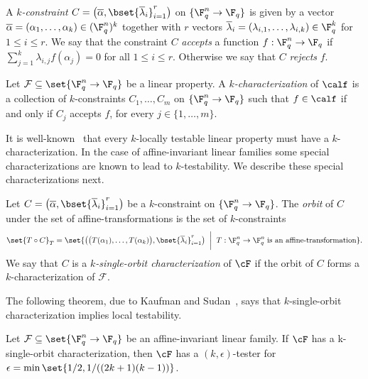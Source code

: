 \begin{definition}
A \emph{$k$-constraint} $C=\bigl(\overline \alpha, \bset{\overline \lambda_i}_{i=1}^{r}\bigr)$
on $\{\F_{q}^n \to \F_q\}$ is
given by a vector $\overline \alpha = (\alpha_1,\ldots,\alpha_k) \in (\F_{q}^n)^k$
together with $r$ vectors
 $\overline \lambda_i = (\lambda_{i,1}, \ldots, \lambda_{i,k}) \in \F_q^k$ for
$1 \leq i \leq r$.
We say that the constraint $C$ \emph{accepts} a function $f: \F_{q}^n \to \F_{q}$ if
$\sum_{j=1}^k \lambda_{i,j} f(\alpha_j) = 0$ for all $1 \leq i \leq r$. Otherwise we say that $C$ \emph{rejects} $f$.

Let $\mathcal{F} \subseteq \set{\F_{q}^n \to \F_q}$ be a linear property.
A \emph{$k$-characterization} of $\calf$ is a collection of $k$-constraints
$C_1, \ldots, C_m$ on $\{\F_q^n \to \F_q\}$ such that $f \in \calf$ if and only if $C_j$
accepts $f$, for every $j \in \{1,\ldots,m\}$.
\end{definition}

It is well-known~\cite{BHR05} that every $k$-locally testable linear property must have a
$k$-characterization. In the case of affine-invariant linear families some special characterizations
are known to lead to $k$-testability. We describe these special characterizations next.

\begin{definition}\label{defn:single orbit}
Let $C=\big(\overline \alpha, \bset{\overline \lambda_i}_{i=1}^{r}\big)$ be a $k$-constraint
on $\{\F_{q}^n \to \F_q\}$.
The \emph{orbit} of $C$ under the set of affine-transformations is the set of $k$-constraints
\[\set{T \circ C}_T = \set{ \big( \big(T(\alpha_1),\ldots,T(\alpha_k)\big), \bset{\overline \lambda_i}_{i=1}^{r} \big)\; \; \bigg| \; \; T:\F_{q}^n \to \F_q^n \; \text{is an affine-transformation}}.\]
We say that $C$ is a \emph{$k$-single-orbit characterization} of $\cF$
if the orbit of $C$ forms a $k$-characterization of $\mathcal{F}$.
\end{definition}

The following theorem, due to Kaufman and Sudan~\cite{KS08}, says that $k$-single-orbit characterization implies local testability.

\begin{theorem}\label{thm:KS}
Let $\mathcal{F} \subseteq \set{\F_{q}^n \to \F_q}$ be an affine-invariant linear family. If
$\cF$ has a k-single-orbit characterization, then $\cF$ has a
$(k,\epsilon)$-tester for 
$\epsilon = \min\set{1/2, {1}/{((2k+1)(k-1))}}$.

\end{theorem}

